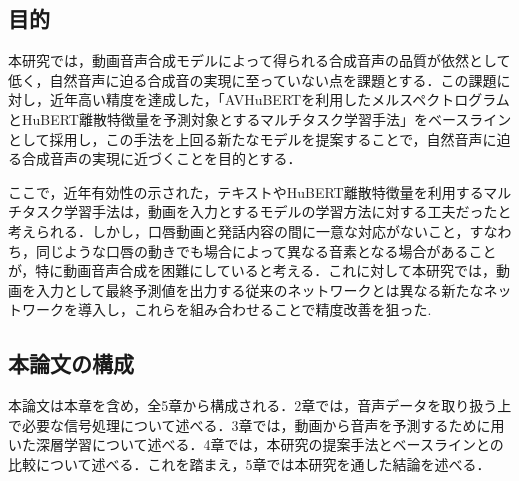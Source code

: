 \subsection{目的}
本研究では，動画音声合成モデルによって得られる合成音声の品質が依然として低く，自然音声に迫る合成音の実現に至っていない点を課題とする．この課題に対し，近年高い精度を達成した，「AVHuBERTを利用したメルスペクトログラムとHuBERT離散特徴量を予測対象とするマルチタスク学習手法」をベースラインとして採用し，この手法を上回る新たなモデルを提案することで，自然音声に迫る合成音声の実現に近づくことを目的とする．

ここで，近年有効性の示された，テキストやHuBERT離散特徴量を利用するマルチタスク学習手法は，動画を入力とするモデルの学習方法に対する工夫だったと考えられる．しかし，口唇動画と発話内容の間に一意な対応がないこと，すなわち，同じような口唇の動きでも場合によって異なる音素となる場合があることが，特に動画音声合成を困難にしていると考える．これに対して本研究では，動画を入力として最終予測値を出力する従来のネットワークとは異なる新たなネットワークを導入し，これらを組み合わせることで精度改善を狙った.

\subsection{本論文の構成}
本論文は本章を含め，全5章から構成される．2章では，音声データを取り扱う上で必要な信号処理について述べる．3章では，動画から音声を予測するために用いた深層学習について述べる．4章では，本研究の提案手法とベースラインとの比較について述べる．これを踏まえ，5章では本研究を通した結論を述べる．
